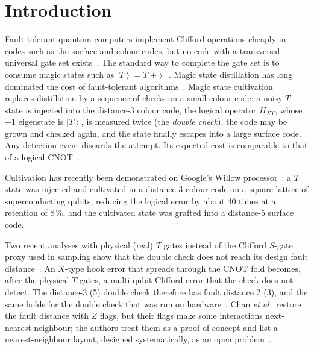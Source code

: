 \documentclass[aps,pra,reprint,superscriptaddress,longbibliography]{revtex4-2}
\newcommand{\ket}[1]{\left|#1\right\rangle}
\newcommand{\HXY}{H_{XY}}
\begin{document}
\maketitle

\section{Introduction}

Fault-tolerant quantum computers implement Clifford operations cheaply in codes such as the surface and colour codes, but no code with a transversal universal gate set exists~\cite{EastinKnill2009}.
The standard way to complete the gate set is to consume magic states such as $\ket{T}=T\ket{+}$~\cite{BravyiKitaev2005}.
Magic state distillation has long dominated the cost of fault-tolerant algorithms~\cite{Litinski2019}.
Magic state cultivation~\cite{Gidney2024cultivation} replaces distillation by a sequence of checks on a small colour code: a noisy $T$ state is injected into the distance-3 colour code, the logical operator $\HXY$, whose $+1$ eigenstate is $\ket{T}$, is measured twice (the \emph{double check}), the code may be grown and checked again, and the state finally escapes into a large surface code.
Any detection event discards the attempt.
Its expected cost is comparable to that of a logical CNOT~\cite{Gidney2024cultivation}.

Cultivation has recently been demonstrated on Google's Willow processor~\cite{Rosenfeld2025}: a $T$ state was injected and cultivated in a distance-3 colour code on a square lattice of superconducting qubits, reducing the logical error by about 40 times at a retention of 8\,\%, and the cultivated state was grafted into a distance-5 surface code.

Two recent analyses with physical (real) $T$ gates instead of the Clifford $S$-gate proxy used in sampling show that the double check does not reach its design fault distance~\cite{Chan2026diagnosing,WanZapirain2026}.
An $X$-type hook error that spreads through the CNOT fold becomes, after the physical $T$ gates, a multi-qubit Clifford error that the check does not detect.
The distance-3 (5) double check therefore has fault distance 2 (3), and the same holds for the double check that was run on hardware~\cite{Chan2026diagnosing}.
Chan \emph{et al.}\ restore the fault distance with $Z$ flags, but their flags make some interactions next-nearest-neighbour; the authors treat them as a proof of concept and list a nearest-neighbour layout, designed systematically, as an open problem~\cite{Chan2026diagnosing}.
\end{document}
